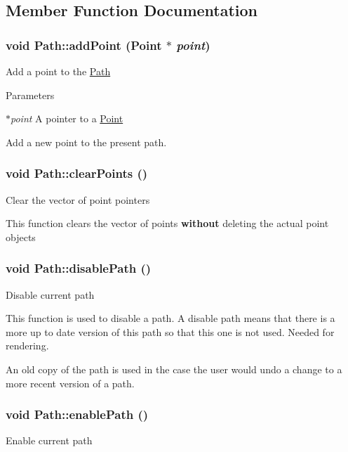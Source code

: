\subsection{Member Function Documentation}
\hypertarget{classPath_a1610bba846616d5109fb505fdf902298}{
\subsubsection[{addPoint}]{\setlength{\rightskip}{0pt plus 5cm}void Path::addPoint ({\bf Point} $\ast$ {\em point})}}
\label{classPath_a1610bba846616d5109fb505fdf902298}
Add a point to the \hyperlink{classPath}{Path} 
\begin{DoxyParams}{Parameters}
\item[{\em $\ast$point}]A pointer to a \hyperlink{classPoint}{Point}\end{DoxyParams}
Add a new point to the present path. \hypertarget{classPath_af70e0919d6eb3319a883ad7a28ac13cc}{
\subsubsection[{clearPoints}]{\setlength{\rightskip}{0pt plus 5cm}void Path::clearPoints ()}}
\label{classPath_af70e0919d6eb3319a883ad7a28ac13cc}
Clear the vector of point pointers

This function clears the vector of points {\bfseries without} deleting the actual point objects \hypertarget{classPath_acb7454dd8e4b007f93b11042fb5fe025}{
\subsubsection[{disablePath}]{\setlength{\rightskip}{0pt plus 5cm}void Path::disablePath ()}}
\label{classPath_acb7454dd8e4b007f93b11042fb5fe025}
Disable current path

This function is used to disable a path. A disable path means that there is a more up to date version of this path so that this one is not used. Needed for rendering.

An old copy of the path is used in the case the user would undo a change to a more recent version of a path. \hypertarget{classPath_a4d622d8253416598cafe0a787a84e9e7}{
\subsubsection[{enablePath}]{\setlength{\rightskip}{0pt plus 5cm}void Path::enablePath ()}}
\label{classPath_a4d622d8253416598cafe0a787a84e9e7}
Enable current path

